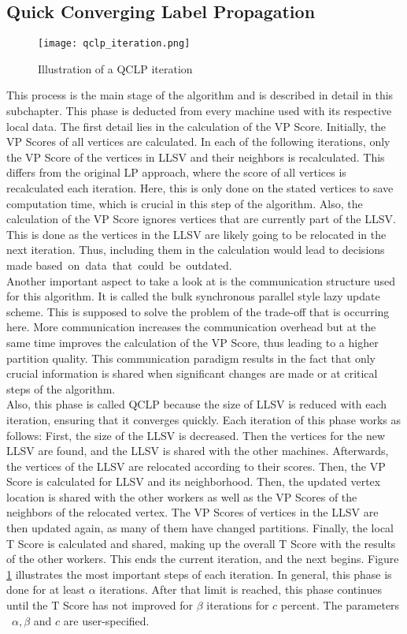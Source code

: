 \documentclass[acmsmall,nonacm,screen,review]{acmart}
\begin{document}
\subsection{Quick Converging Label Propagation}
\begin{figure}[b]
\centering
\caption{Illustration of a QCLP iteration}
\label{iteration}
\texttt{[image: qclp\_iteration.png]}
\end{figure}
This process is the main stage of the algorithm and is described in detail in this subchapter. This phase is deducted from every machine used with its respective local data. The first detail lies in the calculation of the VP Score. Initially, the VP Scores of all vertices are calculated. In each of the following iterations, only the VP Score of the vertices in LLSV and their neighbors is recalculated. This differs from the original LP approach, where the score of all vertices is recalculated each iteration. Here, this is only done on the stated vertices to save computation time, which is crucial in this step of the algorithm. Also, the calculation of the VP Score ignores vertices that are currently part of the LLSV. This is done as the vertices in the LLSV are likely going to be relocated in the next iteration. Thus, including them in the calculation would lead to decisions made \hbox{based on data that could be outdated.} 
\\
Another important aspect to take a look at is the communication structure used for this algorithm. It is called the bulk synchronous parallel style \cite{BSP} lazy update scheme. This is supposed to solve the problem of the trade-off that is occurring here. More communication increases the communication overhead but at the same time improves the calculation of the VP Score, thus leading to a higher partition quality. This communication paradigm  results in the fact that only crucial information is shared when significant changes are made or at critical steps of the algorithm. \\
Also, this phase is called QCLP because the size of LLSV is reduced with each iteration, ensuring that it converges quickly. Each iteration of this phase works as follows: First, the size of the LLSV is decreased. Then the vertices for the new LLSV are found, and the LLSV is shared with the other machines. Afterwards, the vertices of the LLSV are relocated according to their scores. Then, the VP Score is calculated for LLSV and its neighborhood. Then, the updated vertex location is shared with the other workers as well as the VP Scores of the neighbors of the relocated vertex. The VP Scores of vertices in the LLSV are then updated again, as many of them have changed partitions. Finally, the local T Score is calculated and shared, making up the overall T Score with the results of the other workers. This ends the current iteration, and the next begins. Figure \ref{iteration} illustrates the most important steps of each iteration. In general, this phase is done for at least $\alpha$ iterations. After that limit is reached, this phase continues until the T Score has not improved for $\beta$ iterations for $c$ percent. The parameters ~$\alpha,\beta$ and $c$ are user-specified. \\
\end{document}
